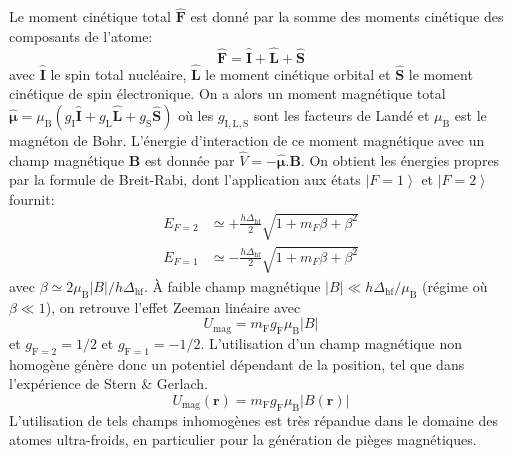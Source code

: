 Le moment cinétique total $\hat{\mathbf{F}}$ est donné par la somme des moments cinétique des composants de l'atome:
\begin{equation}
\hat{\mathbf{F}}=\hat{\mathbf{I}}+\hat{\mathbf{L}}+\hat{\mathbf{S}}
\end{equation}
avec $\hat{\mathbf{I}}$ le spin total nucléaire, $\hat{\mathbf{L}}$ le moment cinétique orbital et $\hat{\mathbf{S}}$ le moment cinétique de spin électronique. On a alors un moment magnétique total $\hat{\boldsymbol\mu}=\mu_{\mathrm{B}} (g_{\mathrm{I}} \hat{\mathbf{I}} + g_{\mathrm{L}} \hat{\mathbf{L}} + g_{\mathrm{S}} \hat{\mathbf{S}})$ où les $g_{\mathrm{I},\mathrm{L},\mathrm{S}}$ sont les facteurs de Landé et $\mu_{\mathrm{B}}$ est le magnéton de Bohr. L'énergie d'interaction de ce moment magnétique avec un champ magnétique $\mathbf{B}$ est donnée par $\hat{V}=-\hat{\boldsymbol\mu}.\mathbf{B}$. On obtient les énergies propres par la formule de Breit-Rabi, dont l'application aux états $\left| F=1 \right\rangle$ et $\left| F=2 \right\rangle$ fournit:
\begin{equation}
\begin{aligned}
E_{F=2} &\simeq + \frac{h \Delta_{\mathrm{hf}}}{2} \sqrt{1+ m_F \beta +\beta^2} \\
E_{F=1} &\simeq - \frac{h \Delta_{\mathrm{hf}}}{2} \sqrt{1+ m_F \beta +\beta^2}
\end{aligned}
\end{equation}
avec $\beta \simeq 2 \mu_{\mathrm{B}} \left| B \right| /h \Delta_{\mathrm{hf}}$. À faible champ magnétique $\left| B \right| \ll h \Delta_{\mathrm{hf}} / \mu_{\mathrm{B}}$ (régime où $\beta \ll 1$), on retrouve l'effet Zeeman linéaire avec
\begin{equation}
U_{\mathrm{mag}}=m_{\mathrm{F}} g_{\mathrm{F}} \mu_{\mathrm{B}} \left| B \right|
\end{equation}
et $g_{\mathrm{F}=2}= 1/2$ et $g_{\mathrm{F}=1} =-1/2$. L'utilisation d'un champ magnétique non homogène génère donc un potentiel dépendant de la position, tel que dans l'expérience de Stern \& Gerlach. 
\begin{equation}
U_{\mathrm{mag}} (\mathbf{r}) = m_{\mathrm{F}} g_{\mathrm{F}} \mu_{\mathrm{B}} \left| B(\mathbf{r}) \right|
\end{equation}
L'utilisation de tels champs inhomogènes est très répandue dans le domaine des atomes ultra-froids, en particulier pour la génération de pièges magnétiques.







